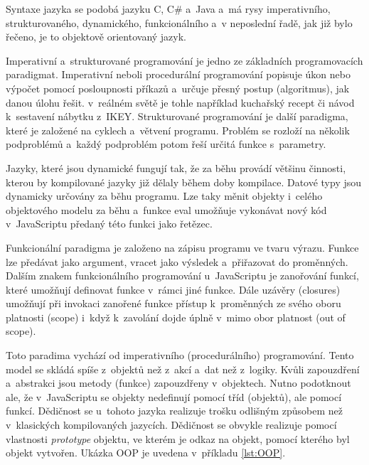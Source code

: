 Syntaxe jazyka se podobá jazyku C, C\# a~Java a~má rysy imperativního, strukturovaného, dynamického, funkcionálního a~v neposlední řadě, jak již bylo řečeno, je to objektově orientovaný jazyk.


Imperativní a~strukturované programování je jedno ze základních programovacích paradigmat. Imperativní neboli procedurální programování popisuje úkon nebo výpočet pomocí posloupnosti příkazů a~určuje přesný postup (algoritmus), jak danou úlohu řešit. v~reálném světě je tohle například kuchařský recept či návod k~sestavení nábytku z~IKEY. Strukturované programování je další paradigma, které je založené na cyklech a~větvení programu. Problém se rozloží na několik podproblémů a~každý podproblém potom řeší určitá funkce s~parametry. \\


Jazyky, které jsou dynamické fungují tak, že za běhu provádí většinu činnosti, kterou by kompilované jazyky již dělaly během doby kompilace. Datové typy jsou dynamicky určovány za běhu programu. Lze taky měnit objekty i~celého objektového modelu za běhu a~funkce eval umožňuje vykonávat nový kód v~JavaScriptu předaný této funkci jako řetězec. \\


Funkcionální paradigma je založeno na zápisu programu ve tvaru výrazu. Funkce lze předávat jako argument, vracet jako výsledek a~přiřazovat do proměnných. Dalším znakem funkcionálního programování u~JavaScriptu je zanořování funkcí, které umožňují definovat funkce v~rámci jiné funkce. Dále uzávěry (closures) umožňují při invokaci zanořené funkce přístup k~proměnných ze svého oboru platnosti (scope) i~když k~zavolání dojde úplně v~mimo obor platnost (out of scope). \\


Toto paradima vychází od imperativního (procedurálního) programování. Tento model se skládá spíše z~objektů než z~akcí a~dat než z~logiky. Kvůli zapouzdření a~abstrakci jsou metody (funkce) zapouzdřeny v~objektech. Nutno podotknout ale, že v~JavaScriptu se objekty nedefinují pomocí tříd (objektů), ale pomocí funkcí. Dědičnost se u~tohoto jazyka realizuje trošku odlišným způsobem než v~klasických kompilovaných jazycích. Dědičnost se obvykle realizuje pomocí vlastnosti \textit{prototype} objektu, ve kterém je odkaz na objekt, pomocí kterého byl objekt vytvořen. Ukázka OOP je uvedena v~příkladu \ref{lst:OOP}.\cite{13}\cite{14}

